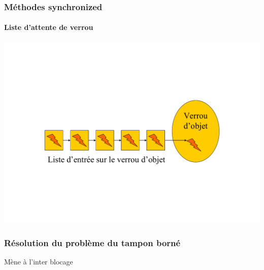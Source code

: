 \begin{frame}
\frametitle{Méthodes synchronized}
\framesubtitle{Liste d'attente de verrou}
\includegraphics[width=\textwidth]{../illustration/methode_synchronized.pdf}
\end{frame}

\begin{frame}
\frametitle{Résolution du problème du tampon borné}
\begin{scriptsize}\end{scriptsize}
\begin{center}
{\LARGE Mène à l'inter blocage}
\end{center}
\end{frame}


